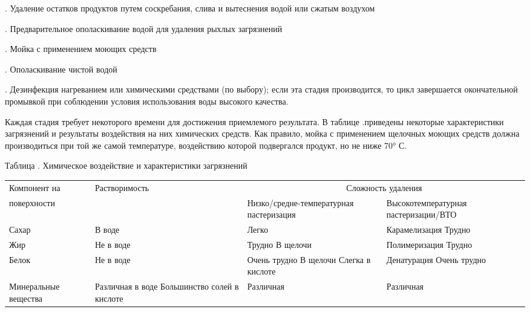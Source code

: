 {\par {}. Удаление остатков продуктов путем соскребания, слива и вытеснения водой или сжатым воздухом
\par {}. Предварительное ополаскивание водой для удаления рыхлых загрязнений
\par {}. Мойка с применением моющих средств
\par {}. Ополаскивание чистой водой
\par {}. Дезинфекция нагреванием или химическими средствами (по выбору); если эта стадия производится, то цикл завершается окончательной промывкой при соблюдении условия использования воды высокого качества.  

\par \redline Каждая стадия требует некоторого времени для достижения приемлемого результата.
В таблице \thechaptercntr .\thetablecntr \spc  приведены некоторые характеристики загрязнений и результаты воздействия на них химических средств. Как правило, мойка с применением щелочных моющих средств должна производиться при той же самой температуре, воздействию которой подвергался продукт, но не ниже 70° С.

\begin{flushleft}
	\par \centering Таблица \thechaptercntr .\thetablecntr \spc {--} Химическое воздействие и характеристики загрязнений
\end{flushleft} \addtocounter{thetablecntr}{1}

\par \redline\begin{tabular}{|p{2.7cm}| p{3cm}| p{4cm} |p{4.2cm}|}
	\hline
	Компонент на & Растворимость & \multicolumn{2}{c|}{ Сложность удаления} \\
	\cline{3-4}
	поверхности&  & Низко/средне-температурная пастеризация & Высокотемпературная пастеризации/ВТО \\
	\hline
	Сахар & В воде & Легко & Карамелизация Трудно \\
	\hline
	Жир & Не в воде & Трудно В щелочи & Полимеризация Трудно \\
	\hline
	Белок & Не в воде & Очень трудно В щелочи Слегка в кислоте & Денатурация Очень трудно \\
	\hline
	Минеральные вещества & Различная в воде Большинство солей в кислоте & Различная & Различная \\
	\hline
\end{tabular}

\par \redline \phantom{помогіте} 

}
